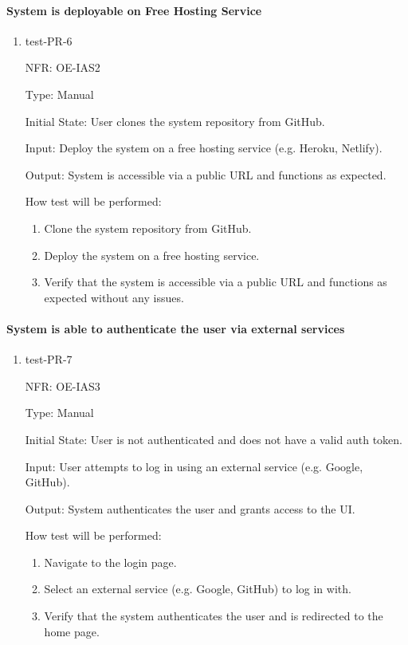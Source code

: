 \documentclass[12pt, titlepage]{article}
\begin{document}
\paragraph{System is deployable on Free Hosting Service}
\begin{enumerate}
  \item{test-PR-6}

  NFR: OE-IAS2

  Type: Manual
            
  Initial State: User clones the system repository from GitHub.
            
  Input:  Deploy the system on a free hosting service (e.g. Heroku, Netlify).
            
  Output: System is accessible via a public URL and functions as expected.
            
  How test will be performed: 
  \begin{enumerate}
    \item Clone the system repository from GitHub.
    \item Deploy the system on a free hosting service.
    \item Verify that the system is accessible via a public URL and functions as expected without any issues.
  \end{enumerate}
\end{enumerate}

\paragraph{System is able to authenticate the user via external services}
\begin{enumerate}
  \item{test-PR-7}

  NFR: OE-IAS3

  Type: Manual
            
  Initial State: User is not authenticated and does not have a valid auth token.
            
  Input: User attempts to log in using an external service (e.g. Google, GitHub).
            
  Output: System authenticates the user and grants access to the UI.
            
  How test will be performed: 
  \begin{enumerate}
    \item Navigate to the login page.
    \item Select an external service (e.g. Google, GitHub) to log in with.
    \item Verify that the system authenticates the user and is redirected to the home page.
  \end{enumerate}
\end{enumerate}
\end{document}
